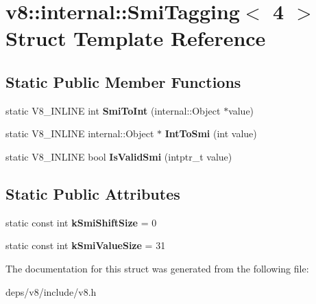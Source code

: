 \hypertarget{structv8_1_1internal_1_1_smi_tagging_3_014_01_4}{}\section{v8\+:\+:internal\+:\+:Smi\+Tagging$<$ 4 $>$ Struct Template Reference}
\label{structv8_1_1internal_1_1_smi_tagging_3_014_01_4}
\subsection*{Static Public Member Functions}
\begin{DoxyCompactItemize}
\item 
\hypertarget{structv8_1_1internal_1_1_smi_tagging_3_014_01_4_a31da2e4e3969d4c61a46d59639d6e92f}{}static V8\+\_\+\+I\+N\+L\+I\+N\+E int {\bfseries Smi\+To\+Int} (internal\+::\+Object $\ast$value)\label{structv8_1_1internal_1_1_smi_tagging_3_014_01_4_a31da2e4e3969d4c61a46d59639d6e92f}

\item 
\hypertarget{structv8_1_1internal_1_1_smi_tagging_3_014_01_4_abbc2788d901a590f3b9276e7e0d4059b}{}static V8\+\_\+\+I\+N\+L\+I\+N\+E internal\+::\+Object $\ast$ {\bfseries Int\+To\+Smi} (int value)\label{structv8_1_1internal_1_1_smi_tagging_3_014_01_4_abbc2788d901a590f3b9276e7e0d4059b}

\item 
\hypertarget{structv8_1_1internal_1_1_smi_tagging_3_014_01_4_a7ca3b3a7b14e2fbea5decac3675ac619}{}static V8\+\_\+\+I\+N\+L\+I\+N\+E bool {\bfseries Is\+Valid\+Smi} (intptr\+\_\+t value)\label{structv8_1_1internal_1_1_smi_tagging_3_014_01_4_a7ca3b3a7b14e2fbea5decac3675ac619}

\end{DoxyCompactItemize}
\subsection*{Static Public Attributes}
\begin{DoxyCompactItemize}
\item 
\hypertarget{structv8_1_1internal_1_1_smi_tagging_3_014_01_4_a4230f8d72054619f8141d0524733d8e9}{}static const int {\bfseries k\+Smi\+Shift\+Size} = 0\label{structv8_1_1internal_1_1_smi_tagging_3_014_01_4_a4230f8d72054619f8141d0524733d8e9}

\item 
\hypertarget{structv8_1_1internal_1_1_smi_tagging_3_014_01_4_a0857bbaab799b39a51f578744bf855f8}{}static const int {\bfseries k\+Smi\+Value\+Size} = 31\label{structv8_1_1internal_1_1_smi_tagging_3_014_01_4_a0857bbaab799b39a51f578744bf855f8}

\end{DoxyCompactItemize}


The documentation for this struct was generated from the following file\+:\begin{DoxyCompactItemize}
\item 
deps/v8/include/v8.\+h\end{DoxyCompactItemize}
